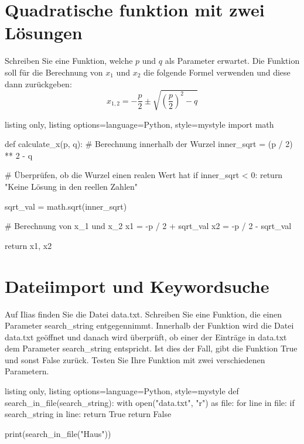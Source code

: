 \documentclass[11pt, oneside]{book}
\begin{document}
\section{Quadratische funktion mit zwei Lösungen}
Schreiben Sie eine Funktion, welche $p$ und $q$ als Parameter erwartet. Die Funktion soll für die Berechnung von $x_1$ und $x_2$ die folgende Formel verwenden und diese dann zurückgeben:
\begin{equation*}
    x_{1, 2} = - \frac{p}{2} \pm \sqrt{\left( \frac{p}{2}\right)^2 -q}
\end{equation*}
\begin{tcblisting}{listing only, listing options={language=Python, style=mystyle}}
import math

def calculate_x(p, q):
    # Berechnung innerhalb der Wurzel
    inner_sqrt = (p / 2) ** 2 - q

    # Überprüfen, ob die Wurzel einen realen Wert hat
    if inner_sqrt < 0:
        return "Keine Lösung in den reellen Zahlen"

    sqrt_val = math.sqrt(inner_sqrt)

    # Berechnung von x_1 und x_2
    x1 = -p / 2 + sqrt_val
    x2 = -p / 2 - sqrt_val

    return x1, x2
\end{tcblisting}

\section{Dateiimport und Keywordsuche}
Auf Ilias finden Sie die Datei data.txt. Schreiben Sie eine Funktion, die einen Parameter search\_string entgegennimmt. Innerhalb der Funktion wird die Datei data.txt geöffnet und danach wird überprüft, ob einer der Einträge in data.txt dem Parameter search\_string entspricht. Ist dies der Fall, gibt die Funktion True und sonst False zurück. Testen Sie Ihre Funktion mit zwei verschiedenen Parametern.
\begin{tcblisting}{listing only, listing options={language=Python, style=mystyle}}
def search_in_file(search_string):
    with open("data.txt", "r") as file:
        for line in file:
            if search_string in line:
                return True
    return False

print(search_in_file("Haus"))
\end{tcblisting}

\newpage
\end{document}

